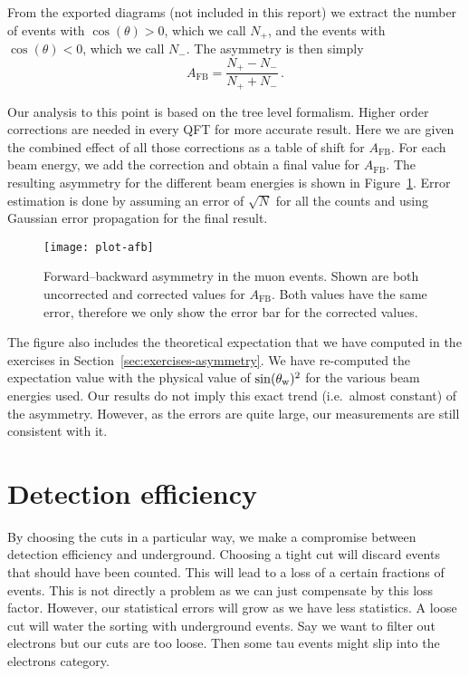 \documentclass[11pt, english, fleqn, DIV=15, headinclude, BCOR=2cm]{scrreprt}
\begin{document}
From the exported diagrams (not included in this report) we extract the number
of events with $\cos(\theta) > 0$, which we call $N_+$, and the events with
$\cos(\theta) < 0$, which we call $N_-$. The asymmetry is then simply
\[
    A_\text{FB} = \frac{N_+ - N_-}{N_+ + N_-} \,.
\]

Our analysis to this point is based on the tree level formalism. Higher order
corrections are needed in every QFT for more accurate result. Here we are given
the combined effect of all those corrections as a table of shift for
$A_\text{FB}$. For each beam energy, we add the correction and obtain a final
value for $A_\text{FB}$. The resulting asymmetry for the different beam
energies is shown in Figure~\ref{fig:plot-afb}. Error estimation is done by
assuming an error of $\sqrt{N}$ for all the counts and using Gaussian error
propagation for the final result.

\begin{figure}
    \centering
    \texttt{[image: plot-afb]}
    \caption{%
        Forward--backward asymmetry in the muon events. Shown are both
        uncorrected and corrected values for $A_\text{FB}$. Both values have
        the same error, therefore we only show the error bar for the corrected
        values.
    }
    \label{fig:plot-afb}
\end{figure}

The figure also includes the theoretical expectation that we have computed in
the exercises in Section~\ref{sec:exercises-asymmetry}. We have re-computed the
expectation value with the physical value of $\sin(\theta_\text w)^2$ for the
various beam energies used. Our results do not imply this exact trend (i.e.\
almost constant) of the asymmetry. However, as the errors are quite large, our
measurements are still consistent with it.

\section{Detection efficiency}
\label{sec:detection-efficiency}

By choosing the cuts in a particular way, we make a compromise between
detection efficiency and underground. Choosing a tight cut will discard events
that should have been counted. This will lead to a loss of a certain fractions
of events. This is not directly a problem as we can just compensate by this
loss factor. However, our statistical errors will grow as we have less
statistics. A loose cut will water the sorting with underground events. Say we
want to filter out electrons but our cuts are too loose. Then some tau events
might slip into the electrons category.
\end{document}
